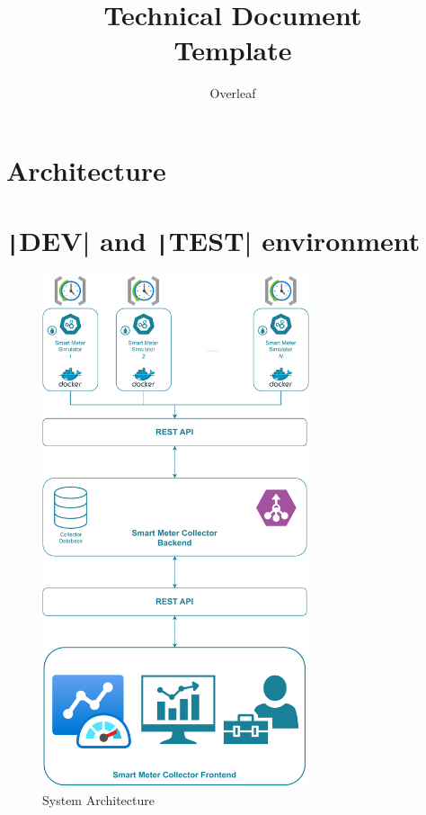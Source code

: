 \documentclass{ol-softwaremanual}
\title{Technical Document \\Template}
\author{Overleaf}
\begin{document}
\maketitle

\tableofcontents
\listoflistings
\newpage

\section{Architecture}

\section{\texttt|DEV| and \texttt|TEST| environment}
\begin{figure}
    \centering
    \includegraphics[width=0.7\textwidth]{fig_01}
    \caption{System Architecture}\label{fig::001}
\end{figure}
\end{document}
